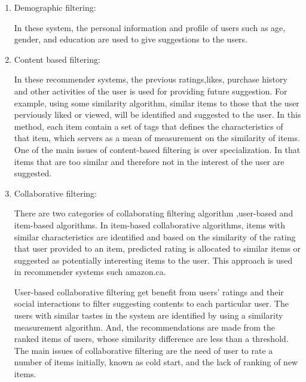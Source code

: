 \documentclass [12pt]{article} \usepackage{multicol}
\begin{document}
\begin{enumerate}

\item Demographic filtering:

 In these system, the personal information and profile of users such as age, gender,
and education are used to give suggestions to the users.

\item Content based filtering:

 In these recommender systems, the previous ratings,likes, purchase history and other
activities of the user is used for providing future suggestion.
 For example, using some similarity algorithm, similar items to those that
  the user perviously liked or viewed, will be identified and suggested to the user. In this method,
each item contain a set of tags that defines the characteristics
of that item, which servers as a mean of measurement on the
similarity of items. One of the main issues of content-based
filtering is over specialization. In that items that are too
similar and therefore not in the interest of the user are
suggested.


\item Collaborative filtering:

		There are two categories of collaborating filtering
	algorithm ,user-based and item-based algorithms. In
	item-based collaborative algorithms, items with similar
	characteristics are identified and based on the similarity of
	the rating that user provided to an item, predicted rating is
	allocated to similar items or suggested as potentially
	interesting items to the user. This approach is used in
	recommender systems such amazon.ca.

	User-based collaborative filtering get benefit from users'
ratings and  their social interactions to filter suggesting
contents to each particular user. The users with similar tastes
in the system are identified by using a similarity measurement
algorithm. And, the recommendations are made from the ranked items of
users, whose similarity difference are less than a threshold. \newline The main issues of collaborative filtering are the
need of user to rate a number of items initially, known as cold
start, and the lack of ranking of new items.



\end{enumerate}
\end{document}

